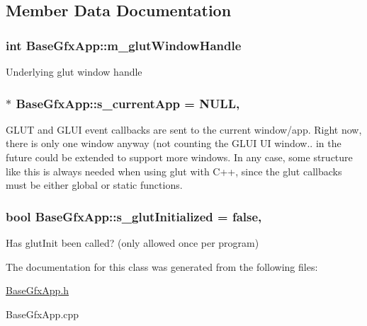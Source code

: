\subsection{Member Data Documentation}
\hypertarget{classBaseGfxApp_ad8697d6fdd10e6f336c3a662016b4fa7}{
\subsubsection[{m\-\_\-glut\-Window\-Handle}]{\setlength{\rightskip}{0pt plus 5cm}int Base\-Gfx\-App\-::m\-\_\-glut\-Window\-Handle\hspace{0.3cm}{\ttfamily [protected]}}}\label{classBaseGfxApp_ad8697d6fdd10e6f336c3a662016b4fa7}
Underlying glut window handle \hypertarget{classBaseGfxApp_a65ba89b98af31e2649a0546631931000}{
\subsubsection[{s\-\_\-current\-App}]{ $\ast$ Base\-Gfx\-App\-::s\-\_\-current\-App = N\-U\-L\-L\hspace{0.3cm}{\ttfamily [static]}, {\ttfamily [protected]}}}\label{classBaseGfxApp_a65ba89b98af31e2649a0546631931000}
G\-L\-U\-T and G\-L\-U\-I event callbacks are sent to the current window/app. Right now, there is only one window anyway (not counting the G\-L\-U\-I U\-I window.. in the future could be extended to support more windows. In any case, some structure like this is always needed when using glut with C++, since the glut callbacks must be either global or static functions. \hypertarget{classBaseGfxApp_afa4690383ea27713016ef75b9fb1e42f}{
\subsubsection[{s\-\_\-glut\-Initialized}]{\setlength{\rightskip}{0pt plus 5cm}bool Base\-Gfx\-App\-::s\-\_\-glut\-Initialized = false\hspace{0.3cm}{\ttfamily [static]}, {\ttfamily [protected]}}}\label{classBaseGfxApp_afa4690383ea27713016ef75b9fb1e42f}
Has glut\-Init been called? (only allowed once per program) 

The documentation for this class was generated from the following files\-:\begin{DoxyCompactItemize}
\item 
\hyperlink{BaseGfxApp_8h}{Base\-Gfx\-App.\-h}\item 
Base\-Gfx\-App.\-cpp\end{DoxyCompactItemize}
